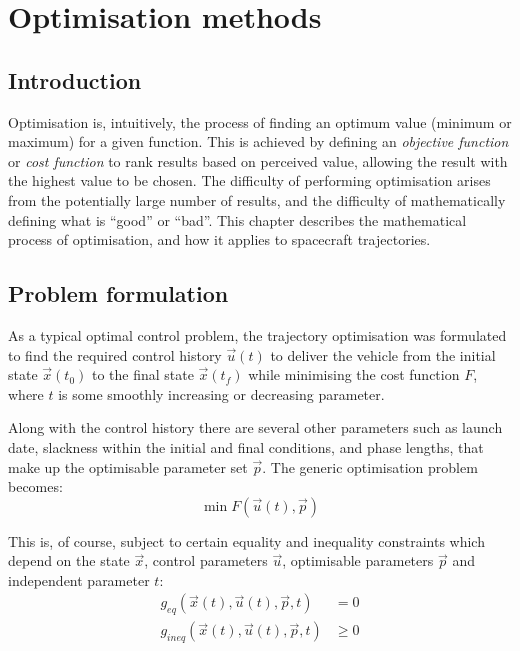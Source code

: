 \chapter{Optimisation methods} \label{cha:Optimisation-methods}
\section{Introduction} \label{sec:Optimisation-Introduction}

Optimisation is, intuitively, the process of finding an optimum value (minimum or maximum) for a given function. This is achieved by defining an \emph{objective function} or \emph{cost function} to rank results based on perceived value, allowing the result with the highest value to be chosen. The difficulty of performing optimisation arises from the potentially large number of results, and the difficulty of mathematically defining what is \enquote{good} or \enquote{bad}. This chapter describes the mathematical process of optimisation, and how it applies to spacecraft trajectories.

\section{Problem formulation}

As a typical optimal control problem, the trajectory optimisation was formulated to find the required control history $\vec{u}(t)$ to deliver the vehicle from the initial state $\vec{x}(t_0)$ to the final state $\vec{x}(t_f)$ while minimising the cost function $F$, where $t$ is some smoothly increasing or decreasing parameter. 

Along with the control history there are several other parameters such as launch date, slackness within the initial and final conditions, and phase lengths, that make up the optimisable parameter set $\vec{p}$. The generic optimisation problem becomes:
\begin{equation}
\min F(\vec{u}(t),\vec{p})
\end{equation}

This is, of course, subject to certain equality and inequality constraints which depend on the state $\vec{x}$, control parameters $\vec{u}$, optimisable parameters $\vec{p}$ and independent parameter $t$:
\begin{align}
g_{eq}(\vec{x}(t),\vec{u}(t),\vec{p},t) &= 0 \\
g_{ineq}(\vec{x}(t),\vec{u}(t),\vec{p},t) &\ge 0 
\end{align}

